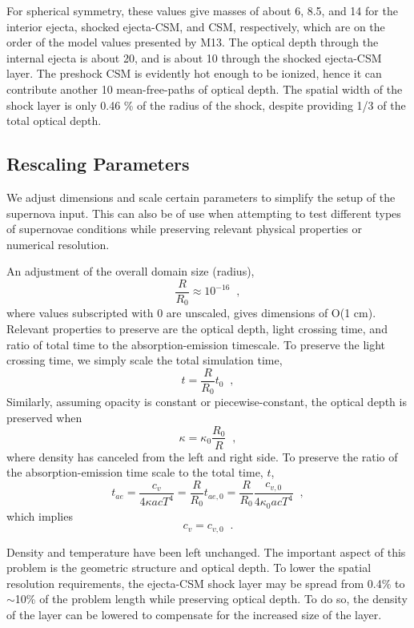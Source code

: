 For spherical symmetry, these values give masses of about 6, 8.5, and 14 for the interior ejecta, shocked ejecta-CSM, and CSM, respectively, which are on the order of the model values presented by M13. The optical depth through the internal ejecta is about 20, and is about 10 through the shocked ejecta-CSM layer. The preshock CSM is evidently hot enough to be ionized, hence it can contribute another 10 mean-free-paths of optical depth. The spatial width of the shock layer is only 0.46 \% of the radius of the shock, despite providing 1/3 of the total optical depth.

\subsection{Rescaling Parameters} \label{sec:rescaling}
We adjust dimensions and scale certain parameters to simplify the setup of the supernova input. This can also be of use when attempting to test different types of supernovae conditions while preserving relevant physical properties or numerical resolution.

An adjustment of the overall domain size (radius),
\begin{equation}
\frac{R}{R_0} \approx 10^{-16} \;\;,
\end{equation}
where values subscripted with $0$ are unscaled, gives dimensions of O(1 cm). Relevant properties to preserve are the optical depth, light crossing time, and ratio of total time to the absorption-emission timescale. To preserve the light crossing time, we simply scale the total simulation time,
\begin{equation}
t = \frac{R}{R_0}t_0 \;\;,
\end{equation}
Similarly, assuming opacity is constant or piecewise-constant, the optical depth is preserved when
\begin{equation}
\kappa = \kappa_0\frac{R_0}{R} \;\;,
\end{equation}
where density has canceled from the left and right side. To preserve the ratio of the absorption-emission time scale to the total time, $t$,
\begin{equation}
t_{ae} = \frac{c_v}{4\kappa acT^4} = \frac{R}{R_0}t_{ae,0}
= \frac{R}{R_0}\frac{c_{v,0}}{4\kappa_0 acT^4} \;\;,
\end{equation}
which implies
\begin{equation}
c_v = c_{v,0} \;\;.
\end{equation}

Density and temperature have been left unchanged. The important aspect of this problem is the geometric structure and optical depth. To lower the spatial resolution requirements, the ejecta-CSM shock layer may be spread from 0.4\% to $\sim$10\% of the problem length while preserving optical depth. To do so, the density of the layer can be lowered to compensate for the increased size of the layer.

